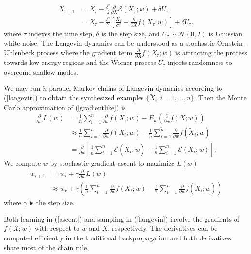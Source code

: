 \documentclass[11pt]{article}
\def\L{L}
\def\En{\mathcal{E}}
\def\I{X}
\begin{document}
\begin{align}
\I_{\tau+1}
&= \I_{\tau} - \frac{\delta^2}{2} \frac{\partial}{\partial\I} \En(\I_\tau;w) + \delta U_\tau \\
&= \I_{\tau} - \frac{\delta^2}{2} \left[ \frac{\I_\tau}{\sigma^2} - \frac{\partial}{\partial \I} f(\I_\tau;w) \right] + \delta U_\tau.\label{langevin}
\end{align}
where $\tau$ indexes the time step, $\delta$ is the step size, and $U_\tau\sim\mathcal{N}(0,I)$ is Gaussian white noise. The Langevin dynamics can be understood as a stochastic Ornstein-Uhlenbeck process where the gradient term $\frac{\partial}{\partial \I} f(\I_\tau;w)$ is attracting the process towards low energy regions and the Wiener process $U_\tau$ injects randomness to overcome shallow modes.

We may run $\tilde n$ parallel Markov chains of Langevin dynamics according to (\ref{langevin}) to obtain the synthesized examples $\{ \tilde\I_{i}, i=1,\ldots,\tilde n \}$. Then the Monte Carlo approximation of (\ref{gradientlike}) is
\begin{align}
\frac{\partial}{\partial w}\L(w) &= \frac{1}{n} \sum_{i=1}^n \frac{\partial}{\partial w} f(\I_i;w) - E_w(\frac{\partial}{\partial w} f(\I;w)) \\
&\approx \frac{1}{n} \sum_{i=1}^n \frac{\partial}{\partial w} f(\I_i;w) - \frac{1}{\tilde n} \sum_{i=1}^{\tilde n} \frac{\partial}{\partial w} f(\tilde\I_i;w) \\
&= \frac{\partial}{\partial w}\left[ \frac{1}{\tilde n}\sum_{i=1}^{\tilde n} \En(\tilde \I_i; w) - \frac{1}{n}\sum_{i=1}^{n} \En(\I_i; w)  \right].
\end{align}
We compute $w$ by stochastic gradient ascent to maximize $\L(w)$
\begin{align}
w_{\tau+1}
&= w_{\tau} + \gamma \frac{\partial}{\partial w}\L(w) \\
&\approx w_{\tau} + \gamma \left( \frac{1}{n} \sum_{i=1}^n \frac{\partial}{\partial w} f(\I_i;w) - \frac{1}{\tilde n} \sum_{i=1}^{\tilde n} \frac{\partial}{\partial w} f(\tilde\I_i;w) \right) \label{ascent}
\end{align}
where $\gamma$ is the step size.

Both learning in (\ref{ascent}) and sampling in (\ref{langevin}) involve the gradients of $f(\I;w)$ with respect to $w$ and $\I$, respectively. The derivatives can be computed efficiently in the traditional backpropagation and both derivatives share most of the chain rule.
\end{document}

